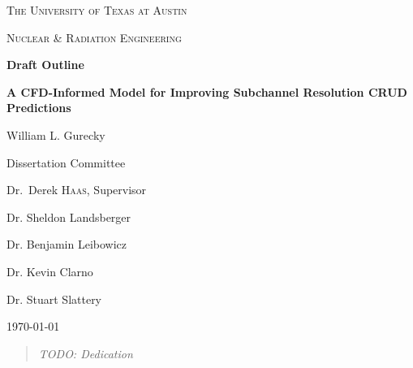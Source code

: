 
\begin{titlepage}
	\centering
	{\scshape\LARGE The University of Texas at Austin \par}
	\vspace{1cm}
	{\scshape\Large Nuclear \& Radiation Engineering \par}
	\vspace{1.5cm}
	
	        {\huge\bfseries Draft Outline \par}
	{\large\bfseries A CFD-Informed Model for Improving Subchannel Resolution CRUD Predictions\par}

	\vspace{2cm}
	{\Large William L. Gurecky \par}
	\vfill

	\begin{flushright}
	Dissertation Committee \par
	\bigskip
	Dr.~Derek \textsc{Haas}, Supervisor \par
	Dr. Sheldon Landsberger \par
	Dr. Benjamin Leibowicz \par
	Dr. Kevin Clarno \par
	Dr. Stuart Slattery \par
	\end{flushright}
	\vfill
	{\large \today\par}
\end{titlepage}
\pagebreak
\tableofcontents
\pagebreak

\clearpage
\vspace*{\fill}
\thispagestyle{empty} %
\begin{quotation}
\em %
TODO: Dedication
\end{quotation}
\vspace*{\fill}

\pagebreak
